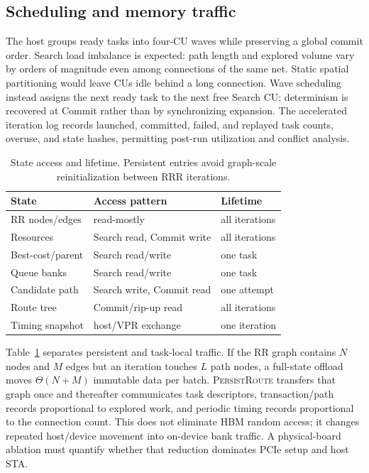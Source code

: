 \documentclass[sigconf,anonymous,review]{acmart}
\newcommand{\system}{\textsc{PersistRoute}}
\begin{document}
\subsection{Scheduling and memory traffic}

The host groups ready tasks into four-CU waves while preserving a global commit
order. Search load imbalance is expected: path length and explored volume vary
by orders of magnitude even among connections of the same net. Static spatial
partitioning would leave CUs idle behind a long connection. Wave scheduling
instead assigns the next ready task to the next free Search CU; determinism is
recovered at Commit rather than by synchronizing expansion. The accelerated
iteration log records launched, committed, failed, and replayed task counts,
overuse, and state hashes, permitting post-run utilization and conflict
analysis.

\begin{table}[t]
\centering
\small
\begin{tabular}{lll}
\toprule
State & Access pattern & Lifetime \\
\midrule
RR nodes/edges & read-mostly & all iterations \\
Resources & Search read, Commit write & all iterations \\
Best-cost/parent & Search read/write & one task \\
Queue banks & Search read/write & one task \\
Candidate path & Search write, Commit read & one attempt \\
Route tree & Commit/rip-up read & all iterations \\
Timing snapshot & host/VPR exchange & one iteration \\
\bottomrule
\end{tabular}
\caption{State access and lifetime. Persistent entries avoid graph-scale
reinitialization between RRR iterations.}
\label{tab:lifetime}
\end{table}

Table~\ref{tab:lifetime} separates persistent and task-local traffic. If the RR
graph contains $N$ nodes and $M$ edges but an iteration touches $L$ path nodes,
a full-state offload moves $\Theta(N+M)$ immutable data per batch. \system{}
transfers that graph once and thereafter communicates task descriptors,
transaction/path records proportional to explored work, and periodic timing
records proportional to the connection count. This does not eliminate HBM
random access; it changes repeated host/device movement into on-device bank
traffic. A physical-board ablation must quantify whether that reduction
dominates PCIe setup and host STA.
\end{document}
